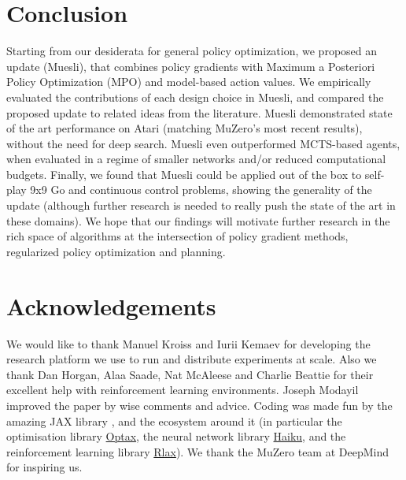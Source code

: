 \documentclass{article}
\begin{document}
\section{Conclusion}
Starting from our desiderata for general policy optimization, we proposed an update (Muesli), that combines policy gradients with Maximum a Posteriori Policy Optimization (MPO) and model-based action values. We empirically evaluated the contributions of each design choice in Muesli, and compared the proposed update to related ideas from the literature. Muesli demonstrated state of the art performance on Atari (matching MuZero's most recent results), without the need for deep search. Muesli even outperformed MCTS-based agents, when evaluated in a regime of smaller networks and/or reduced computational budgets. Finally, we found that Muesli could be applied out of the box to self-play 9x9 Go and continuous control problems, showing the generality of the update (although further research is needed to really push the state of the art in these domains). We hope that our findings will motivate further research in the rich space of algorithms at the intersection of policy gradient methods, regularized policy optimization and planning.

\section*{Acknowledgements}
We would like to thank Manuel Kroiss and Iurii Kemaev for developing the research platform we use to run and distribute experiments at scale. Also we thank Dan Horgan, Alaa Saade, Nat McAleese and Charlie Beattie for their excellent help with reinforcement learning environments. Joseph Modayil improved the paper by wise comments and advice. Coding was made fun by the amazing JAX library \citep{jax2018github}, and the ecosystem around it (in particular the optimisation library \href{https://github.com/deepmind/optax}{Optax}, the neural network library \href{https://github.com/deepmind/dm-haiku}{Haiku}, and the reinforcement learning library \href{https://github.com/deepmind/rlax}{Rlax}). We thank the MuZero team at DeepMind for inspiring us.

\newpage







\onecolumn
{}
\appendix
\end{document}
